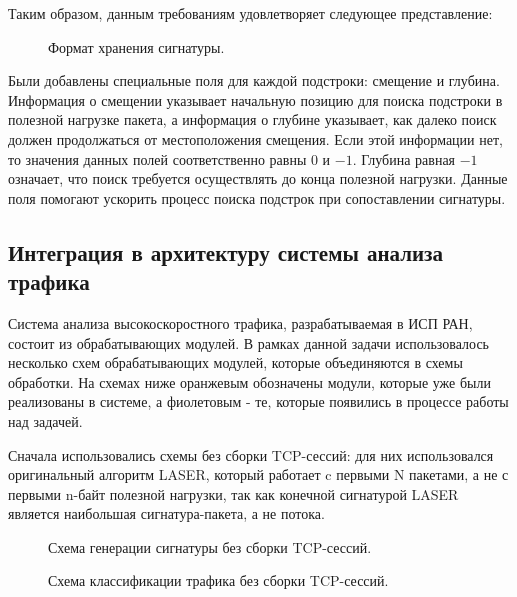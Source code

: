 Таким образом, данным требованиям удовлетворяет следующее представление:

\begin{figure}[H]
    \begin{center}
        
        \caption{Формат хранения сигнатуры.}
    \end{center}
\end{figure}

Были добавлены специальные поля для каждой подстроки: смещение и глубина.
Информация о смещении указывает начальную позицию для поиска подстроки в полезной нагрузке пакета,
а информация о глубине указывает, как далеко поиск должен продолжаться от местоположения смещения.
Если этой информации нет, то значения данных полей соответственно равны $0$ и $-1$.
Глубина равная $-1$ означает, что поиск требуется осуществлять до конца полезной нагрузки.
Данные поля помогают ускорить процесс поиска подстрок при сопоставлении сигнатуры.

\subsection{Интеграция в архитектуру системы анализа трафика}

Система анализа высокоскоростного трафика, разрабатываемая в ИСП РАН, состоит из обрабатывающих модулей.
В рамках данной задачи использовалось несколько схем обрабатывающих модулей, которые объединяются в схемы обработки.
На схемах ниже оранжевым обозначены модули, которые уже были реализованы в системе, а фиолетовым - те, которые появились в процессе работы над задачей.

Сначала использовались схемы без сборки TCP-сессий: для них использовался оригинальный алгоритм LASER,
который работает c первыми N пакетами, а не с первыми n-байт полезной нагрузки, так как конечной сигнатурой LASER является наибольшая сигнатура-пакета, а не потока.

\begin{figure}[H]
    \begin{center}
        
        \caption{Схема генерации сигнатуры без сборки TCP-сессий.}
    \end{center}
\end{figure}

\begin{figure}[H]
    \begin{center}
        
        \caption{Схема классификации трафика без сборки TCP-сессий.}
    \end{center}
\end{figure}

